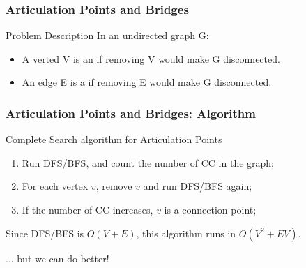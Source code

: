 \documentclass{beamer}
\begin{document}
\begin{frame}
  \frametitle{Articulation Points and Bridges}
  {\smaller
    \begin{block}{Problem Description}
      In an undirected graph G:
      \begin{itemize}
      \item A verted V is an  if removing V would make G disconnected.
      \item An edge E is a  if removing E would make G disconnected.
      \end{itemize}
    \end{block}
    \begin{center}
      \end{center}
  }
\end{frame}

\begin{frame}
  \frametitle{Articulation Points and Bridges: Algorithm}
  {\smaller
    \begin{block}{Complete Search algorithm for Articulation Points}
      \begin{enumerate}
      \item Run DFS/BFS, and count the number of CC in the graph;
      \item For each vertex $v$, remove $v$ and run DFS/BFS again;
      \item If the number of CC increases, $v$ is a connection point;
      \end{enumerate}
      Since DFS/BFS is $O(V+E)$, this algorithm runs in $O(V^2+EV)$.
    \end{block}
    
    \bigskip

    \hfill ... but we can do better!
  }
\end{frame}
\end{document}
